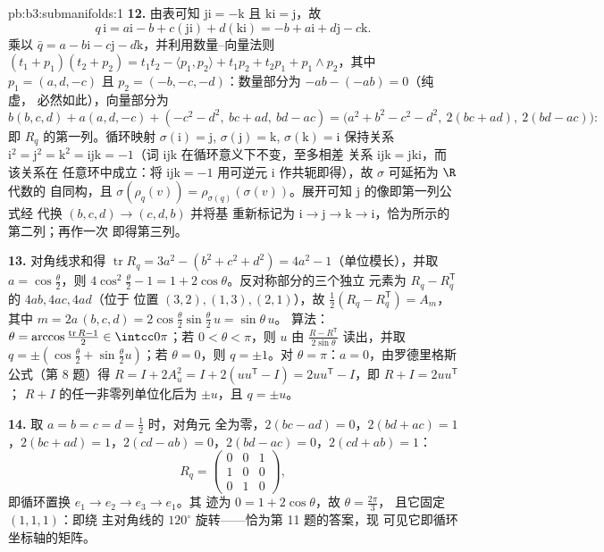 \begin{solution}{pb:b3:submanifolds:1}
\textbf{12.} 由表可知 $\mathrm{ji} = -\mathrm k$ 且
$\mathrm{ki} = \mathrm j$，故
\[
q\,\mathrm i = a\mathrm i - b + c(\mathrm{ji}) +
d(\mathrm{ki}) = -b + a\mathrm i + d\mathrm j - c\mathrm k .
\]
乘以 $\bar q = a - b\mathrm i - c\mathrm j -
d\mathrm k$，并利用数量--向量法则 $(t_1 + p_1)(t_2 +
p_2) = t_1t_2 - \langle p_1, p_2\rangle + t_1p_2 + t_2p_1 +
p_1\wedge p_2$，其中 $p_1 = (a, d, -c)$ 且 $p_2 = (-b, -c,
-d)$：数量部分为 $-ab - (-ab) = 0$（纯虚，
必然如此），向量部分为
\[
b(b, c, d) + a(a, d, -c) + (-c^2 - d^2,\ bc + ad,\ bd - ac)
= \bigl(a^2 + b^2 - c^2 - d^2,\ 2(bc + ad),\ 2(bd -
ac)\bigr):
\]
即 $R_q$ 的第一列。循环映射 $\sigma(\mathrm i)
= \mathrm j$, $\sigma(\mathrm j) = \mathrm k$,
$\sigma(\mathrm k) = \mathrm i$ 保持关系
$\mathrm i^2 = \mathrm j^2 = \mathrm k^2 = \mathrm{ijk} =
-1$（词 $\mathrm{ijk}$ 在循环意义下不变，至多相差
关系 $\mathrm{ijk} = \mathrm{jki}$，而该关系在
任意环中成立：将 $\mathrm{ijk} = -1$ 用可逆元
$\mathrm i$ 作共轭即得），故 $\sigma$ 可延拓为 $\R$ 代数的
自同构，且 $\sigma(\rho_q(v)) =
\rho_{\sigma(q)}(\sigma(v))$。展开可知
$\mathrm j$ 的像即第一列公式经
代换 $(b, c, d) \to (c, d, b)$ 并将基
重新标记为 $\mathrm i \to \mathrm j \to \mathrm k \to \mathrm
i$，恰为所示的第二列；再作一次
即得第三列。

\textbf{13.} 对角线求和得 $\operatorname{tr}R_q =
3a^2 - (b^2 + c^2 + d^2) = 4a^2 - 1$（单位模长），并取
$a = \cos\frac\theta2$，则 $4\cos^2\frac\theta2 - 1 = 1 +
2\cos\theta$。反对称部分的三个独立
元素为 $R_q - R_q^{\mathsf T}$ 的 $4ab, 4ac, 4ad$（位于
位置 $(3,2), (1,3), (2,1)$），故 $\frac12(R_q -
R_q^{\mathsf T}) = A_m$，其中 $m = 2a\,(b, c, d) =
2\cos\frac\theta2\sin\frac\theta2\,u = \sin\theta\,u$。
算法：$\theta = \arccos\frac{\operatorname{tr}R -
1}{2} \in \intcc0\pi$；若 $0 < \theta < \pi$，则 $u$ 由
$\frac{R - R^{\mathsf T}}{2\sin\theta}$ 读出，并取 $q =
\pm(\cos\frac\theta2 + \sin\frac\theta2 u)$；若 $\theta =
0$，则 $q = \pm1$。对 $\theta = \pi$：$a = 0$，由罗德里格斯
公式（第 8 题）得 $R = I + 2A_u^2 = I + 2(uu^{\mathsf T} -
I) = 2uu^{\mathsf T} - I$，即 $R + I = 2uu^{\mathsf T}$；
$R + I$ 的任一非零列单位化后为 $\pm u$，且
$q = \pm u$。

\textbf{14.} 取 $a = b = c = d = \frac12$ 时，对角元
全为零，$2(bc - ad) = 0$，$2(bd + ac) = 1$，$2(bc +
ad) = 1$，$2(cd - ab) = 0$，$2(bd - ac) = 0$，$2(cd + ab) =
1$：
\[
R_q = \begin{pmatrix} 0 & 0 & 1\\ 1 & 0 & 0\\ 0 & 1 & 0
\end{pmatrix},
\]
即循环置换 $e_1 \to e_2 \to e_3 \to e_1$。其
迹为 $0 = 1 + 2\cos\theta$，故 $\theta = \frac{2\pi}3$，
且它固定 $(1,1,1)$：即绕
主对角线的 $120^\circ$ 旋转——恰为第 11 题的答案，现
可见它即循环坐标轴的矩阵。


\end{solution}
